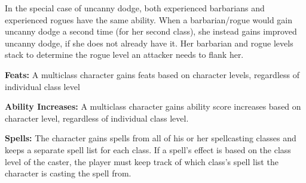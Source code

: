 In the special case of uncanny dodge, both experienced barbarians and experienced rogues have the same ability. When a barbarian/rogue would gain uncanny dodge a second time (for her second class), she instead gains improved uncanny dodge, if she does not already have it. Her barbarian and rogue levels stack to determine the rogue level an attacker needs to flank her.

\textbf{Feats:} A multiclass character gains feats based on character levels, regardless of individual class level

\textbf{Ability Increases:} A multiclass character gains ability score increases based on character level, regardless of individual class level.

\textbf{Spells:} The character gains spells from all of his or her spellcasting classes and keeps a separate spell list for each class. If a spell's effect is based on the class level of the caster, the player must keep track of which class's spell list the character is casting the spell from.

